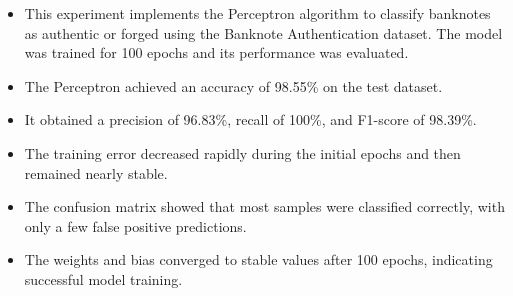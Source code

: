 \documentclass[11pt]{article}
\begin{document}
\begin{itemize}
    \item This experiment implements the Perceptron algorithm to classify banknotes as authentic or forged using the Banknote Authentication dataset. The model was trained for 100 epochs and its performance was evaluated.
    \item The Perceptron achieved an accuracy of 98.55\% on the test dataset.
    \item It obtained a precision of 96.83\%, recall of 100\%, and F1-score of 98.39\%.
    \item The training error decreased rapidly during the initial epochs and then remained nearly stable.
    \item The confusion matrix showed that most samples were classified correctly, with only a few false positive predictions.
    \item The weights and bias converged to stable values after 100 epochs, indicating successful model training.
\end{itemize}

\end{document}
